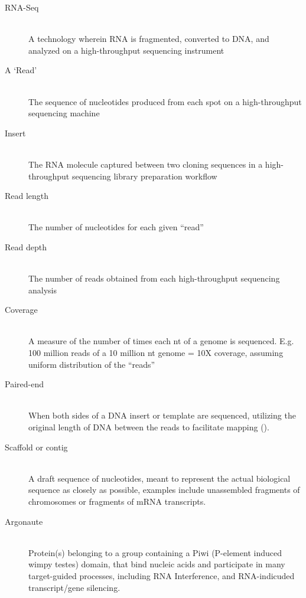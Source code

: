 \label{hd:Definitions} \listDefinitions

\begin{description}
  \item[RNA-Seq] \hfill \\
  A technology wherein RNA is fragmented, converted to DNA, and analyzed on a high-throughput sequencing instrument

  \item[A ‘Read’] \hfill \\
  The sequence of nucleotides produced from each spot on a high-throughput sequencing machine

  \item[Insert] \hfill \\
  The RNA molecule captured between two cloning sequences in a high-throughput sequencing library preparation workflow

  \item[Read length] \hfill \\
  The number of nucleotides for each given ``read''

  \item[Read depth] \hfill \\
  The number of reads obtained from each high-throughput sequencing analysis

  \item[Coverage] \hfill \\
  A measure of the number of times each nt of a genome is sequenced. E.g. 100 million reads of a 10 million nt genome = 10X coverage, assuming uniform distribution of the ``reads''

  \item[Paired-end] \hfill \\
  When both sides of a DNA insert or template are sequenced, utilizing the original length of DNA between the reads to facilitate mapping (\cite{Roach1995}).

  \item[Scaffold or contig] \hfill \\
  A draft sequence of nucleotides, meant to represent the actual biological sequence as closely as possible, examples include unassembled fragments of chromosomes or fragments of mRNA transcripts.

  \item[Argonaute] \hfill \\
  Protein(s) belonging to a group containing a Piwi (P-element induced wimpy testes) domain, that bind nucleic acids and participate in many target-guided processes, including RNA Interference, and RNA-indicuded transcript/gene silencing.


\end{description}
